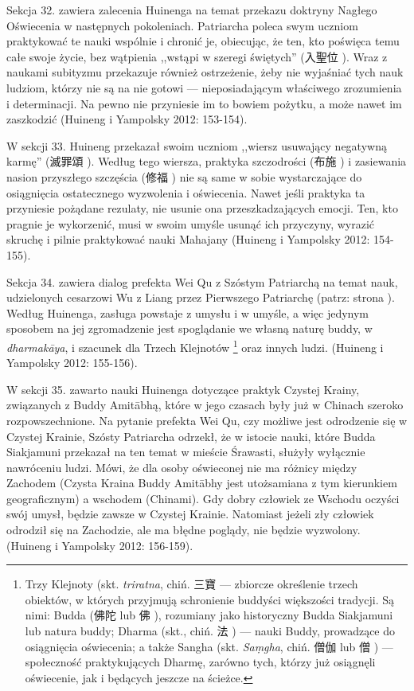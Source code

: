 Sekcja 32. zawiera zalecenia Huinenga na temat przekazu doktryny Nagłego Oświecenia w następnych pokoleniach.
Patriarcha poleca swym uczniom praktykować te nauki wspólnie i chronić je, obiecując, że ten, kto poświęca temu całe swoje życie, bez wątpienia ,,wstąpi w szeregi świętych'' (入聖位 ).
Wraz z naukami subityzmu przekazuje również ostrzeżenie, żeby nie wyjaśniać tych nauk ludziom, którzy nie są na nie gotowi --- nieposiadającym właściwego zrozumienia i determinacji.
Na pewno nie przyniesie im to bowiem pożytku, a może nawet im zaszkodzić
(Huineng i Yampolsky 2012: 153-154).

W sekcji 33. Huineng przekazał swoim uczniom ,,wiersz usuwający negatywną karmę'' (滅罪頌 ).
Według tego wiersza, praktyka szczodrości (布施 ) i zasiewania nasion przyszłego szczęścia (修福 ) nie są same w sobie wystarczające do osiągnięcia ostatecznego wyzwolenia i oświecenia.
Nawet jeśli praktyka ta przyniesie pożądane rezulaty, nie usunie ona przeszkadzających emocji.
Ten, kto pragnie je wykorzenić, musi w swoim umyśle usunąć ich przyczyny, wyrazić skruchę i pilnie praktykować nauki Mahajany
(Huineng i Yampolsky 2012: 154-155).

Sekcja 34. zawiera dialog prefekta Wei Qu z Szóstym Patriarchą na temat nauk, udzielonych cesarzowi Wu z Liang przez Pierwszego Patriarchę (patrz: strona \pageref{LiangWuDi}).
Według Huinenga, zasługa powstaje z umysłu i w umyśle, a więc jedynym sposobem na jej zgromadzenie jest spoglądanie we własną naturę buddy, w \textit{dharmakāya}, i szacunek dla Trzech Klejnotów%
\footnote{Trzy Klejnoty (skt. \textit{triratna}, chiń. 三寶  --- zbiorcze określenie trzech obiektów, w których przyjmują schronienie buddyści większości tradycji. Są nimi: Budda (佛陀  lub 佛 ), rozumiany jako historyczny Budda Siakjamuni lub natura buddy; Dharma (skt., chiń. 法 ) --- nauki Buddy, prowadzące do osiągnięcia oświecenia; a także Sangha (skt. \textit{Sa\d{m}gha}, chiń. 僧伽  lub 僧 ) --- społeczność praktykujących Dharmę, zarówno tych, którzy już osiągnęli oświecenie, jak i będących jeszcze na ścieżce.}
oraz innych ludzi. %
(Huineng i Yampolsky 2012: 155-156).

W sekcji 35. zawarto nauki Huinenga dotyczące praktyk Czystej Krainy, związanych z Buddy Amitābhą, które w jego czasach były już w Chinach szeroko rozpowszechnione.
Na pytanie prefekta Wei Qu, czy możliwe jest odrodzenie się w Czystej Krainie, Szósty Patriarcha odrzekł, że w istocie nauki, które Budda Siakjamuni przekazał na ten temat w mieście Śrawasti, służyły wyłącznie nawróceniu ludzi.
Mówi, że dla osoby oświeconej nie ma różnicy między Zachodem (Czysta Kraina Buddy Amitābhy jest utożsamiana z tym kierunkiem geograficznym) a wschodem (Chinami).
Gdy dobry człowiek ze Wschodu oczyści swój umysł, będzie zawsze w Czystej Krainie.
Natomiast jeżeli zły człowiek odrodził się na Zachodzie, ale ma błędne poglądy, nie będzie wyzwolony.
(Huineng i Yampolsky 2012: 156-159).

